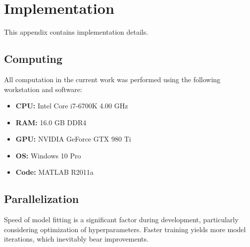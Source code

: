 \chapter{Implementation}
This appendix contains implementation details.
\section{Computing}
All computation in the current work was performed using the following workstation and software:
\begin{itemize}[topsep=0pt,itemsep=-6pt]
  \item \textbf{CPU:} Intel Core i7-6700K 4.00 GHz
  \item \textbf{RAM:} 16.0 GB DDR4
  \item \textbf{GPU:} NVIDIA GeForce GTX 980 Ti
  \item \textbf{OS:} Windows 10 Pro
  \item \textbf{Code:} MATLAB R2011a
\end{itemize}
\section{Parallelization}
Speed of model fitting is a significant factor during development, particularly considering optimization of hyperparameters. Faster training yields more model iterations, which inevitably bear improvements. 

